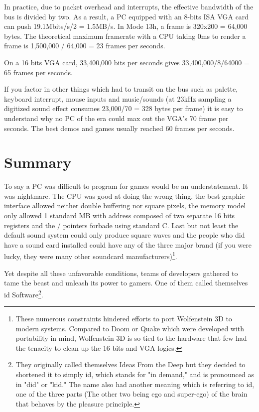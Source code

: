 \documentclass[book.tex]{subfiles}
\begin{document}
 In practice, due to packet overhead and interrupts, the effective bandwidth of the bus is divided by two. As a result, a PC equipped with an 8-bits ISA VGA card can push 19.1Mbits/s/2 = 1.5MB/s. In Mode 13h, a frame is 320x200 = 64,000 bytes. The theoretical maximum framerate with a CPU taking 0ms to render a frame is 1,500,000 / 64,000 = 23 frames per seconds.\\
 \par
 On a 16 bits VGA card, 33,400,000 bits per seconds gives 33,400,000/8/64000 = 65 frames per seconds.\\
 \par
 If you factor in other things which had to transit on the bus such as palette, keyboard interrupt, mouse inputs and music/sounds (at 23kHz sampling a digitized sound effect consumes 23,000/70 = 328 bytes per frame) it is easy to understand why no PC of the era could max out the VGA's 70 frame per seconds. The best demos and games usually reached 60 frames per seconds.


\section{Summary}
To say a PC was difficult to program for games would be an understatement. It was nightmare. The CPU was good at doing the wrong thing, the best graphic interface allowed neither double buffering nor square pixels, the memory model only allowed 1 standard MB with address composed of two separate 16 bits registers and the / pointers forbade using standard C. Last but not least the default sound system could only produce square waves and the people who did have a sound card installed could have any of the three major brand (if you were lucky, they were many other soundcard manufacturers)\footnote{These numerous constraints hindered efforts to port Wolfenstein 3D to modern systems. Compared to Doom or Quake which were developed with portability in mind, Wolfenstein 3D is so tied to the hardware that few had the tenacity to clean up the 16 bits and VGA logics.}.\\
\par
Yet despite all these unfavorable conditions, teams of developers gathered to tame the beast and unleash its power to gamers. One of them called themselves id Software\footnote{They originally called themselves Ideas From the Deep but they decided to shortened it to simply id, which stands for "in demand," and is pronounced as in "did" or "kid." The name also had another meaning which is referring to id, one of the three parts (The other two being ego and super-ego) of the brain that behaves by the pleasure principle.}.
\end{document}
